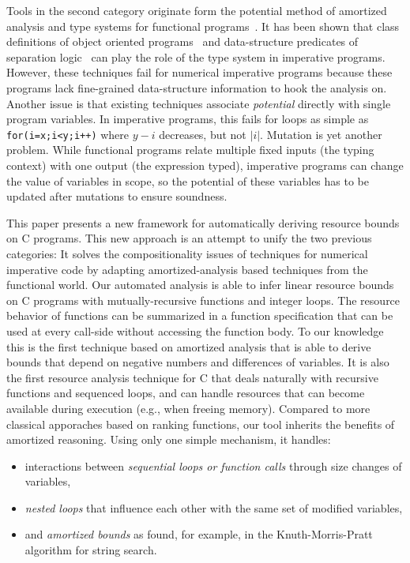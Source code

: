 \documentclass[nocopyrightspace,preprint,pldi]{sigplanconf-pldi15}
\newcommand{\ifshort}[2]{\ifx\fullversion\undefined{#1}\else{#2}\fi}
\newcommand{\itemskipIn}[0]{\ifshort{\vspace{-1pt}}{}}
\begin{document}
Tools in the second category originate form the potential method of
amortized analysis and type systems for functional
programs~\cite{Jost03,HoffmannAH12}. It has been shown that class
definitions of object oriented programs~\cite{Jost06} and
data-structure predicates of separation logic~\cite{Atkey10} can play
the role of the type system in imperative programs. However, these
techniques fail for numerical imperative programs because these programs lack
fine-grained data-structure information to hook the analysis on.
Another issue is that existing techniques associate \emph{potential}
directly with single program variables.  In imperative programs, this
fails for loops as simple as \lstinline{for(i=x;i<y;i++)} where
$y - i$ decreases, but not $|i|$.  Mutation is yet another problem.
While functional programs relate multiple fixed inputs (the typing
context) with one output (the expression typed), imperative programs
can change the value of variables in scope, so the potential of these
variables has to be updated after mutations to ensure soundness.

This paper presents a new framework for automatically
deriving resource bounds on C programs.  This new
approach is an attempt to unify the two previous
categories: It solves the compositionality issues of techniques
for numerical imperative code by adapting amortized-analysis based
techniques from the functional world.
%
Our automated analysis is able to infer linear
resource bounds on C programs with mutually-recursive functions and integer loops.
%
The resource behavior of functions can be summarized
in a function specification that can be used at every
call-side without accessing the function body.
%
To our knowledge this is the first technique based on
amortized analysis that is able to derive bounds that depend on negative numbers
and differences of variables.  It is also the first
resource analysis technique for C that deals naturally with
recursive functions and sequenced loops, and can handle resources that can
become available during execution (e.g., when freeing
memory).  Compared to more classical
apporaches based on ranking functions, our tool inherits
the benefits of amortized reasoning.  Using only one
simple mechanism, it handles:

\begin{itemize}
\item interactions between \emph{sequential loops or
  function calls} through size changes of variables,
\itemskipIn
\item \emph{nested loops} that influence each other
  with the same set of modified variables,
\itemskipIn
\item and \emph{amortized bounds} as found, for example, in
  the Knuth-Morris-Pratt algorithm for string search.
\end{itemize}
\end{document}

